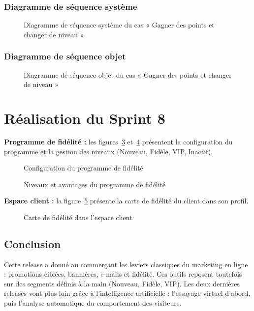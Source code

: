 \subsubsection{Diagramme de séquence système}
\begin{figure}[H]
    \centering
    \caption{Diagramme de séquence système du cas « Gagner des points et changer de niveau »}
    \label{fig:dss-fidelite}
\end{figure}

\subsubsection{Diagramme de séquence objet}
\begin{figure}[H]
    \centering
    \caption{Diagramme de séquence objet du cas « Gagner des points et changer de niveau »}
    \label{fig:dso-fidelite}
\end{figure}

\section{Réalisation du Sprint 8}
\textbf{Programme de fidélité :} les figures~\ref{fig:ui-fidelite-config} et~\ref{fig:ui-fidelite-niveaux} présentent la configuration du programme et la gestion des niveaux (Nouveau, Fidèle, VIP, Inactif).
\begin{figure}[H]
    \centering
    \caption{Configuration du programme de fidélité}
    \label{fig:ui-fidelite-config}
\end{figure}
\begin{figure}[H]
    \centering
    \caption{Niveaux et avantages du programme de fidélité}
    \label{fig:ui-fidelite-niveaux}
\end{figure}

\textbf{Espace client :} la figure~\ref{fig:ui-fidelite-client} présente la carte de fidélité du client dans son profil.
\begin{figure}[H]
    \centering
    \caption{Carte de fidélité dans l'espace client}
    \label{fig:ui-fidelite-client}
\end{figure}

\subsection*{Conclusion}
Cette release a donné au commerçant les leviers classiques du marketing en ligne : promotions ciblées, bannières, e-mails et fidélité. Ces outils reposent toutefois sur des segments définis à la main (Nouveau, Fidèle, VIP). Les deux dernières releases vont plus loin grâce à l'intelligence artificielle : l'essayage virtuel d'abord, puis l'analyse automatique du comportement des visiteurs.
